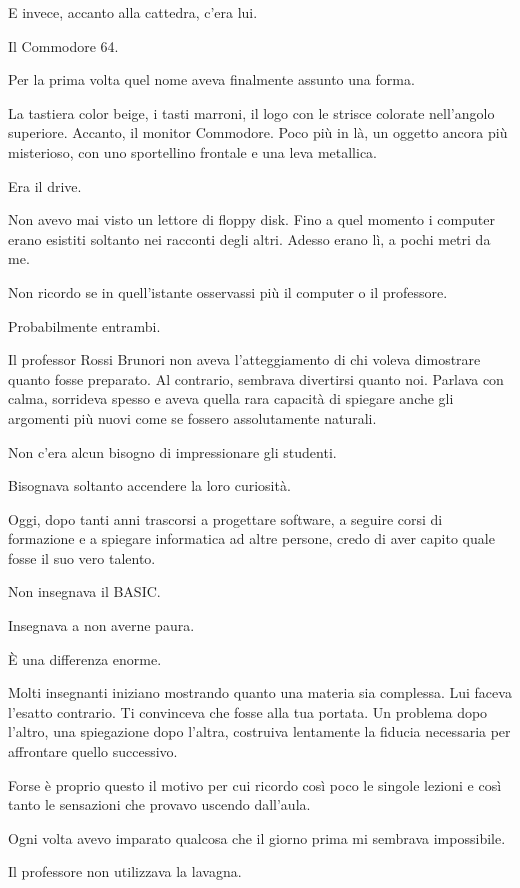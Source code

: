 \documentclass{article}
\begin{document}
E invece, accanto alla cattedra, c'era lui.

Il Commodore 64.

Per la prima volta quel nome aveva finalmente assunto una forma.

La tastiera color beige, i tasti marroni, il logo con le strisce colorate nell'angolo superiore. Accanto, il monitor
Commodore. Poco più in là, un oggetto ancora più misterioso, con uno sportellino frontale e una leva metallica.

Era il drive.

Non avevo mai visto un lettore di floppy disk. Fino a quel momento i computer erano esistiti soltanto nei racconti degli
altri. Adesso erano lì, a pochi metri da me.

Non ricordo se in quell'istante osservassi più il computer o il professore.

Probabilmente entrambi.

Il professor Rossi Brunori non aveva l'atteggiamento di chi voleva dimostrare quanto fosse preparato. Al contrario,
sembrava divertirsi quanto noi. Parlava con calma, sorrideva spesso e aveva quella rara capacità di spiegare anche gli
argomenti più nuovi come se fossero assolutamente naturali.

Non c'era alcun bisogno di impressionare gli studenti.

Bisognava soltanto accendere la loro curiosità.

Oggi, dopo tanti anni trascorsi a progettare software, a seguire corsi di formazione e a spiegare informatica ad altre
persone, credo di aver capito quale fosse il suo vero talento.

Non insegnava il BASIC.

Insegnava a non averne paura.

È una differenza enorme.

Molti insegnanti iniziano mostrando quanto una materia sia complessa. Lui faceva l'esatto contrario. Ti convinceva che
fosse alla tua portata. Un problema dopo l'altro, una spiegazione dopo l'altra, costruiva lentamente la fiducia
necessaria per affrontare quello successivo.

Forse è proprio questo il motivo per cui ricordo così poco le singole lezioni e così tanto le sensazioni che provavo
uscendo dall'aula.

Ogni volta avevo imparato qualcosa che il giorno prima mi sembrava impossibile.

Il professore non utilizzava la lavagna.
\end{document}
